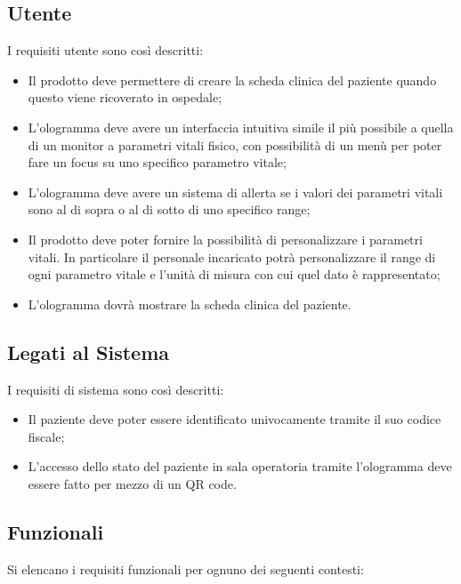 \subsection{Utente}
I requisiti utente sono così descritti:

\begin{itemize}
    \item Il prodotto deve permettere di creare la scheda clinica del paziente quando questo viene ricoverato in ospedale;

    \item L'ologramma deve avere un interfaccia intuitiva simile il più possibile a quella di un monitor a parametri vitali fisico, con possibilità di un menù per poter fare un focus su uno specifico parametro vitale;
    
    \item L'ologramma deve avere un sistema di allerta se i valori dei parametri vitali sono al di sopra o al di sotto di uno specifico range;
    
    \item Il prodotto deve poter fornire la possibilità di personalizzare i parametri vitali. In particolare il personale incaricato potrà personalizzare il range di ogni parametro vitale e l'unità di misura con cui quel dato è rappresentato;
    
    \item L'ologramma dovrà mostrare la scheda clinica del paziente.
\end{itemize}

\subsection{Legati al Sistema}
I requisiti di sistema sono così descritti:
\begin{itemize}

    \item Il paziente deve poter essere identificato univocamente tramite il suo codice fiscale;
    
    \item L'accesso dello stato del paziente in sala operatoria tramite l'ologramma deve essere fatto per mezzo di un QR code.
\end{itemize}

\subsection{Funzionali}
Si elencano i requisiti funzionali per ognuno dei seguenti contesti:

